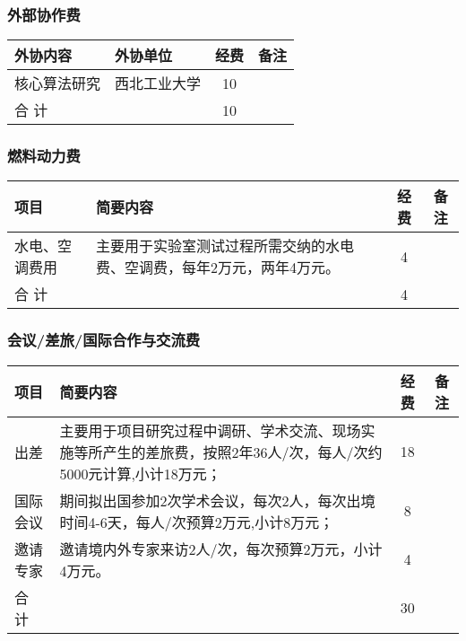 \subsubsection{外部协作费}
\begin{table}[H]
	\centering
	\begin{tabular}{m{3cm} m{7.5cm} cc}
		\toprule
		外协内容     & 外协单位     & 经费 & 备注 \\
		\midrule
		核心算法研究 & 西北工业大学 & 10   &      \\
		合 计        &              & 10          \\
		\bottomrule
	\end{tabular}
\end{table}

\subsubsection{燃料动力费}

\begin{table}[H]
	\centering
	\begin{tabular}{m{3cm} m{7.5cm} cc}
		\toprule
		项目           & 简要内容                                                               & 经费 & 备注 \\
		\midrule
		水电、空调费用 & 主要用于实验室测试过程所需交纳的水电费、空调费，每年2万元，两年4万元。 & 4    &      \\
		合 计          &                                                                        & 4           \\
		\bottomrule
	\end{tabular}
\end{table}

\subsubsection{会议/差旅/国际合作与交流费}
\begin{table}[H]
	\centering
	\begin{tabular}{m{3cm} m{7.5cm} cc}
		\toprule
		项目     & 简要内容                                                                                                         & 经费 & 备注 \\
		\midrule
		出差     & 主要用于项目研究过程中调研、学术交流、现场实施等所产生的差旅费，按照2年36人/次，每人/次约5000元计算,小计18万元； & 18   &      \\
		国际会议 & 期间拟出国参加2次学术会议，每次2人，每次出境时间4-6天，每人/次预算2万元,小计8万元；                              & 8    &      \\
		邀请专家 & 邀请境内外专家来访2人/次，每次预算2万元，小计4万元。                                                             & 4    &      \\
		合 计    &                                                                                                                  & 30          \\
		\bottomrule
	\end{tabular}
\end{table}


